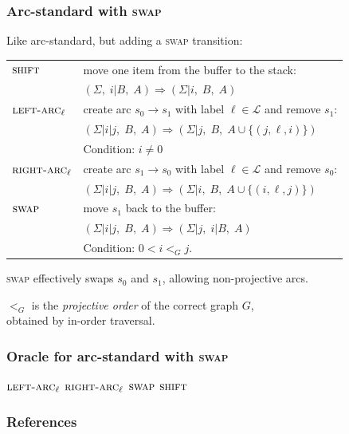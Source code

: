 \documentclass[t]{beamer}
\begin{document}
\begin{frame}
  \frametitle{Arc-standard with \textsc{swap} \cite{nivre2009non}}
  Like arc-standard, but adding a \textsc{swap} transition:

  \begin{tabular}{ll}
    $\textsc{shift}$ & move one item from the buffer to the stack: \\
    & $(\Sigma, \; i | B, \; A) \Rightarrow (\Sigma | i, \; B, \; A)$ \\
    \hline
    $\textsc{left-arc}_\ell$ & create arc $s_0 \to s_1$ with label $\ell \in \mathcal{L}$ and remove $s_1$: \\
    & $(\Sigma | i|j, \; B, \; A) \Rightarrow (\Sigma | j, \; B, \; A \cup \{(j,\ell,i)\})$ \\
    & Condition: $i\neq0$ \\
    \hline
    $\textsc{right-arc}_\ell$ & create arc $s_1 \to s_0$ with label $\ell \in \mathcal{L}$ and remove $s_0$: \\
    & $(\Sigma | i|j, \; B, \; A) \Rightarrow (\Sigma | i, \; B, \; A \cup \{(i,\ell,j)\})$ \\
    \hline
    $\textsc{swap}$ & move $s_1$ back to the buffer: \\
    & $(\Sigma | i|j, \; B, \; A) \Rightarrow (\Sigma | j, \; i | B, \; A)$ \\
    & Condition: $0<i<_Gj$.
  \end{tabular}
  
  \pause\vfill
  
  \textsc{swap} effectively swaps $s_0$ and $s_1$, allowing non-projective arcs.
    
    \pause\vfill
    
    $<_G$ is the \textit{projective order} of the correct graph $G$, \\
    obtained by in-order traversal.
\end{frame}

\begin{frame}
    \frametitle{Oracle for arc-standard with \textsc{swap}}
    \begin{algorithmic}[0]
            \RETURN $\textsc{left-arc}_\ell$
            \RETURN $\textsc{right-arc}_\ell$
            \RETURN $\textsc{swap}$
        \ELSE
            \RETURN $\textsc{shift}$
        \ENDIF
    \ENDWHILE
    \end{algorithmic}
\end{frame}

\begin{frame}[allowframebreaks]
\frametitle{References}

\tiny
\end{frame}
\end{document}
